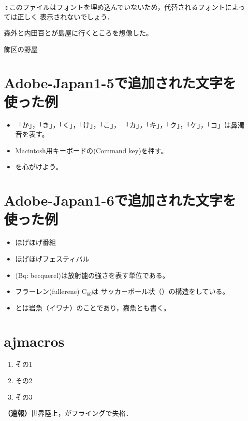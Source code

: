 \documentclass{bxjsarticle}
\begin{document}
※このファイルはフォントを埋め込んでいないため，代替されるフォントによっては正しく
表示されないでしょう．

森外と内田百とが島屋に行くところを想像した。

飾区の野屋

\section*{Adobe-Japan1-5で追加された文字を使った例}
\begin{itemize}
  \item 「\゜か」，「\゜き」，「\゜く」，「\゜け」，「\゜こ」，
        「\゜カ」，「\゜キ」，「\゜ク」，「\゜ケ」，「\゜コ」は鼻濁音を表す。
  \item Macintosh用キーボードの(Command key)を押す。
  \item {}を心がけよう。
\end{itemize}

\section*{Adobe-Japan1-6で追加された文字を使った例}
\begin{itemize}
  \item ほげほげ番組
  \item ほげほげフェスティバル
  \item {}(Bq: becquerel)は放射能の強さを表す単位である。
  \item フラーレン(fullerene) C$_{60}$は
        サッカーボール状（）の構造をしている。
  \item {}とは岩魚（イワナ）のことであり，嘉魚とも書く。
\end{itemize}

\section*{ajmacros}

\begin{enumerate}\renewcommand{\labelenumi}{\ajLabel\ajKuroKaku{enumi}}
\item その1
\item その2
\item その3
\end{enumerate}

{\bf（速報）}世界陸上，がフライングで失格．
\end{document}
